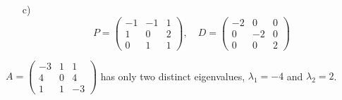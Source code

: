 {\begin{enumerate}
        We could reduce further if we like. But we can see at this point that vectors in the null space have the form $$x = \begin{pmatrix}x_1\\x_2\\x_3 \end{pmatrix} = \begin{pmatrix}x_3\\2x_3\\x_3 \end{pmatrix} = x_3 \begin{pmatrix} 1\\2\\1\end{pmatrix}$$ 
        A vector that is a basis for the eigenspace is $$v_3 = \begin{pmatrix} 1\\2\\1\end{pmatrix}$$ But any non-zero multiple of this vector would also be ok. 
        \item[c)] $$P = \begin{pmatrix} -1&-1&1\\1&0&2\\0&1&1\end{pmatrix}, \quad D = \begin{pmatrix} -2&0&0\\0&-2&0\\0&0&2\end{pmatrix}$$
    \end{enumerate}
    } \fi
\fi    
\ifnum {}
\ifnum {} \newpage \fi
 \question[3] 
$A = \begin{pmatrix}-3&1&1\\4&0&4\\1&1&-3 \end{pmatrix}$ has only two distinct eigenvalues, $\lambda_1 = -4$ and $\lambda_2 = 2$.   

